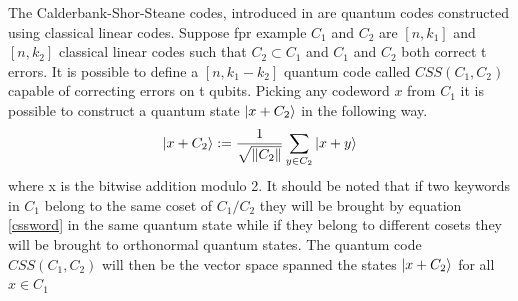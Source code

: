 \documentclass{article}
\begin{document}
The Calderbank-Shor-Steane codes, introduced in \cite{calderbank1996good} are quantum codes constructed using classical linear codes.
Suppose fpr example $C_1$ and $C_2$ are $[n,k_1]$ and $[n,k_2]$ classical linear codes such that $C_2 \subset C_1$
and $C_1$ and $C_2$ both correct t errors.
It is possible to define a $[n, k_1 - k_2]$ quantum code called $CSS(C_1, C_2)$ capable of
correcting errors on t qubits.
Picking any codeword $x$ from $C_1$ it is possible to construct a quantum state $\ket{x + C_2}$
in the following way.
\begin{equation}
	\label{cssword}
	\ket{x + C_2} := \dfrac{1}{\sqrt{\|C_2\|}} \sum_{y \in C_2}\ket{x+y}
\end{equation}
where x is the bitwise addition modulo 2.
It should be noted that if two keywords in $C_1$ belong to the same coset of $C_1/C_2$
they will be brought by equation \ref{cssword} in the same quantum
state while if they belong to different cosets they will be brought
to orthonormal quantum states.
The quantum code $CSS(C_1, C_2)$ will then be the vector space spanned the states
$\ket{x+C_2}$ for all $x \in C_1$
\end{document}
